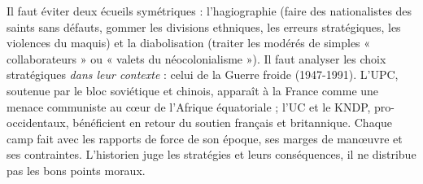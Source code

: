 \documentclass[11pt]{article}
\newcommand{\cle}[1]{{\popxbold\color{popdark}#1}}
\begin{document}
\begin{attention}
Il faut éviter deux écueils symétriques : l'\cle{hagiographie} (faire des nationalistes des saints sans défauts, gommer les divisions ethniques, les erreurs stratégiques, les violences du maquis) et la \cle{diabolisation} (traiter les modérés de simples « collaborateurs » ou « valets du néocolonialisme »). Il faut analyser les choix stratégiques \emph{dans leur contexte} : celui de la \cle{Guerre froide} (1947-1991). L'UPC, soutenue par le bloc soviétique et chinois, apparaît à la France comme une menace communiste au cœur de l'Afrique équatoriale ; l'UC et le KNDP, pro-occidentaux, bénéficient en retour du soutien français et britannique. Chaque camp fait avec les rapports de force de son époque, ses marges de manœuvre et ses contraintes. L'historien juge les stratégies et leurs conséquences, il ne distribue pas les bons points moraux.
\end{attention}
\end{document}
